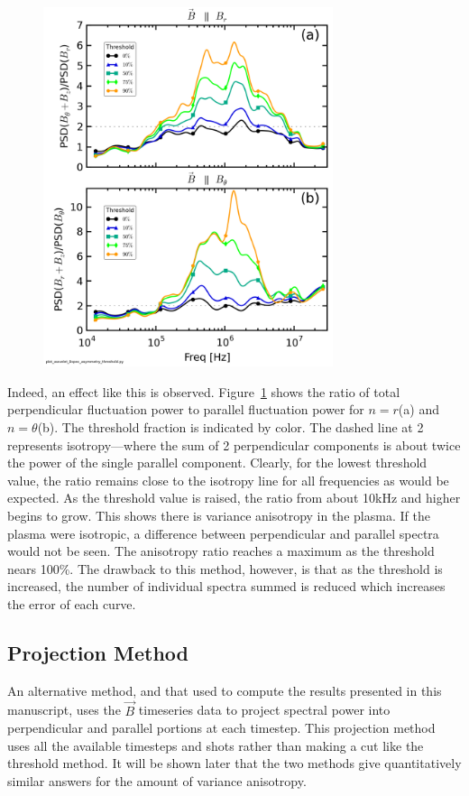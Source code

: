 \documentclass[aip,prl,amsmath,amssymb,reprint,superscriptaddress]{revtex4-1} %
\begin{document}
\begin{figure}[!htbp]
\centerline{
\includegraphics[width=8.5cm]{Bperppara_spectra_thresholdscan40t60us}}
\caption{\label{fig:thresholdmethod}}
\end{figure}

Indeed, an effect like this is observed. Figure~\ref{fig:thresholdmethod} shows the ratio of total perpendicular fluctuation power to parallel fluctuation power for $n = r$(a) and $n = \theta$(b). The threshold fraction is indicated by color. The dashed line at 2 represents isotropy---where the sum of 2 perpendicular components is about twice the power of the single parallel component. Clearly, for the lowest threshold value, the ratio remains close to the isotropy line for all frequencies as would be expected. As the threshold value is raised, the ratio from about 10kHz and higher begins to grow. This shows there is variance anisotropy in the plasma. If the plasma were isotropic, a difference between perpendicular and parallel spectra would not be seen. The anisotropy ratio reaches a maximum as the threshold nears 100\%. The drawback to this method, however, is that as the threshold is increased, the number of individual spectra summed is reduced which increases the error of each curve.

\subsection{Projection Method}

An alternative method, and that used to compute the results presented in this manuscript, uses the $\vec{B}$ timeseries data to project spectral power into perpendicular and parallel portions at each timestep. This projection method uses all the available timesteps and shots rather than making a cut like the threshold method. It will be shown later that the two methods give quantitatively similar answers for the amount of variance anisotropy.
\end{document}
